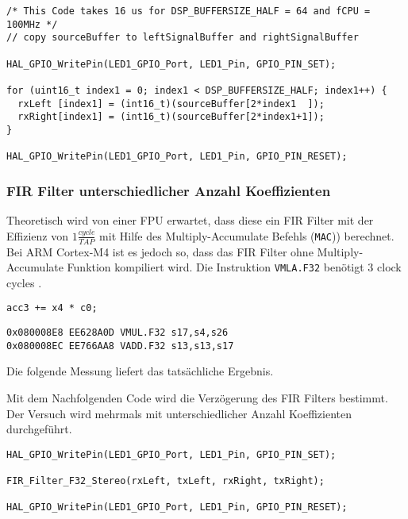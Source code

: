 \begin{lstlisting}[style=Cuvision, caption={GPIO togglen um die Kopierzeit zu messen}]
/* This Code takes 16 us for DSP_BUFFERSIZE_HALF = 64 and fCPU = 100MHz */
// copy sourceBuffer to leftSignalBuffer and rightSignalBuffer

HAL_GPIO_WritePin(LED1_GPIO_Port, LED1_Pin, GPIO_PIN_SET);

for (uint16_t index1 = 0; index1 < DSP_BUFFERSIZE_HALF; index1++) {
  rxLeft [index1] = (int16_t)(sourceBuffer[2*index1  ]);  
  rxRight[index1] = (int16_t)(sourceBuffer[2*index1+1]); 
}

HAL_GPIO_WritePin(LED1_GPIO_Port, LED1_Pin, GPIO_PIN_RESET);
\end{lstlisting}


\subsubsection{FIR Filter unterschiedlicher Anzahl Koeffizienten}

Theoretisch wird von einer FPU erwartet, dass diese ein FIR Filter mit der Effizienz von $1\frac{cycle}{TAP}$ mit Hilfe des Multiply-Accumulate Befehls (\texttt{MAC})) berechnet.
Bei ARM Cortex-M4 ist es jedoch so, dass das FIR Filter ohne Multiply-Accumulate Funktion kompiliert wird. Die Instruktion \texttt{VMLA.F32} benötigt 3 clock cycles \cite{ARM-M4-FPU-reference}. \\

\begin{lstlisting}[style=Cuvision,caption={Beispiel eines Multiply-Accumulate Befehls in C aus der CMSIS/DSP Library \texttt{arm\_fir\_f32.c}}, firstnumber=465]
acc3 += x4 * c0;
\end{lstlisting}

\begin{lstlisting}[style=Cuvision,caption={Assemblierte Multiply-Accumulate Instruktion aus obiger C-Code Zeile}]
0x080008E8 EE628A0D VMUL.F32 s17,s4,s26
0x080008EC EE766AA8 VADD.F32 s13,s13,s17
\end{lstlisting}

Die folgende Messung liefert das tatsächliche Ergebnis.

Mit dem Nachfolgenden Code wird die Verzögerung des FIR Filters bestimmt.
Der Versuch wird mehrmals mit unterschiedlicher Anzahl Koeffizienten durchgeführt.\\

\begin{lstlisting}[style=Cuvision,caption={GPIO togglen um FIR Verarbeitungszeit zu messen}]
HAL_GPIO_WritePin(LED1_GPIO_Port, LED1_Pin, GPIO_PIN_SET);

FIR_Filter_F32_Stereo(rxLeft, txLeft, rxRight, txRight);

HAL_GPIO_WritePin(LED1_GPIO_Port, LED1_Pin, GPIO_PIN_RESET);
\end{lstlisting}



